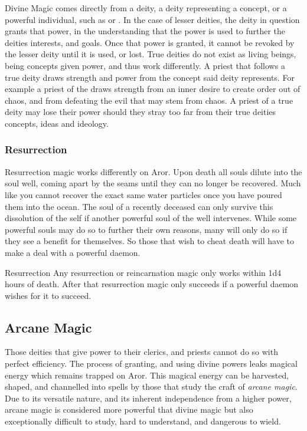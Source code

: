 Divine Magic comes directly from a deity, a deity representing a concept, or a
powerful individual, such as  or . In
the case of lesser deities, the deity in question grants that power, in the
understanding that the power is used to further the deities interests, and
goals. Once that power is granted, it cannot be revoked by the lesser deity
until it is used, or lost. True deities do not exist as living beings, being
concepts given power, and thus work differently. A priest that follows a true
deity draws strength and power from the concept said deity represents. For
example a priest of the  draws strength from an inner desire
to create order out of chaos, and from defeating the evil that may stem from
chaos. A priest of a true deity may lose their power should they stray too
far from their true deities concepts, ideas and ideology.

\subsubsection{Resurrection}

Resurrection magic works differently on Aror. Upon death all souls dilute into
the soul well, coming apart by the seams until they can no longer be recovered.
Much like you cannot recover the exact same water particles once you have
poured them into the ocean. The soul of a recently deceased can only survive
this dissolution of the self if another powerful soul of the well intervenes.
While some powerful souls may do so to further their own reasons, many will only
do so if they see a benefit for themselves. So those that wish to cheat death
will have to make a deal with a powerful daemon.

\begin{35e}{Resurrection}
  Any resurrection or reincarnation magic only works within 1d4 hours of
  death. After that resurrection magic only succeeds if a powerful daemon
  wishes for it to succeed.
\end{35e}

\subsection{Arcane Magic}
\label{sec:Arcane Magic}

Those deities that give power to their clerics, and priests cannot do so with
perfect efficiency. The process of granting, and using divine powers leaks
magical energy which remains trapped on Aror. This magical energy can be
harvested, shaped, and channelled into spells by those that study the craft of
\emph{arcane magic}. Due to its versatile nature, and its inherent
independence from a higher power, arcane magic is considered more powerful
that divine magic but also exceptionally difficult to study, hard to
understand, and dangerous to wield.


